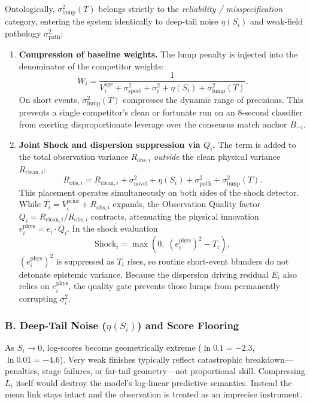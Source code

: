 \documentclass[12pt]{article}
\newcommand{\sigmai}{\sigma_i^2}
\newcommand{\ssport}{\sigma_{\mathrm{sport}}^2}      %
\newcommand{\slump}{\sigma_{\mathrm{lump}}^2}  %
\newcommand{\ephys}{e_i^{\mathrm{phys}}}
\begin{document}
	Ontologically, $\slump(T)$ belongs strictly to the \textit{reliability / misspecification} category, entering the system identically to deep-tail noise $\eta(S_i)$ and weak-field pathology $\sigma_{\mathrm{path}}^2$:
	\begin{enumerate}
		\item \textbf{Compression of baseline weights.} The lump penalty is injected into the denominator of the competitor weights:
		\begin{equation}
			W_i = \frac{1}{V_i^{\mathrm{age}} + \ssport + \sigmai + \eta(S_i) + \slump(T)}.
		\end{equation}
		On short events, $\slump(T)$ compresses the dynamic range of precisions. This prevents a single competitor's clean or fortunate run on an 8-second classifier from exerting disproportionate leverage over the consensus match anchor $B_{-i}$.
		
		\item \textbf{Joint Shock and dispersion suppression via $Q_i$.} The term is added to the total observation variance $R_{\mathrm{obs},i}$ \textit{outside} the clean physical variance $R_{\mathrm{clean},i}$:
		\begin{equation}
			R_{\mathrm{obs},i} = R_{\mathrm{clean},i} + \sigma_{\mathrm{novel}}^2 + \eta(S_i) + \sigma_{\mathrm{path}}^2 + \slump(T).
		\end{equation}
		This placement operates simultaneously on both sides of the shock detector. While $T_i = V_i^{\mathrm{prior}} + R_{\mathrm{obs},i}$ expands, the Observation Quality factor $Q_i = R_{\mathrm{clean},i} / R_{\mathrm{obs},i}$ contracts, attenuating the physical innovation $\ephys = e_i \cdot Q_i$. In the shock evaluation
		\begin{equation}
			\text{Shock}_i = \max\!\left(0,\; (\ephys)^2 - T_i\right),
		\end{equation}
		$(\ephys)^2$ is suppressed as $T_i$ rises, so routine short-event blunders do not detonate epistemic variance. Because the dispersion driving residual $E_i$ also relies on $\ephys$, the quality gate prevents those lumps from permanently corrupting $\sigmai$.
	\end{enumerate}
	
	\subsubsection*{B. Deep-Tail Noise ($\eta(S_i)$) and Score Flooring}
	As $S_i \to 0$, log-scores become geometrically extreme ($\ln 0.1 = -2.3$, $\ln 0.01 = -4.6$). Very weak finishes typically reflect catastrophic breakdown---penalties, stage failures, or far-tail geometry---not proportional skill. Compressing $L_i$ itself would destroy the model's log-linear predictive semantics. Instead the mean link stays intact and the observation is treated as an imprecise instrument.
	
\end{document}
